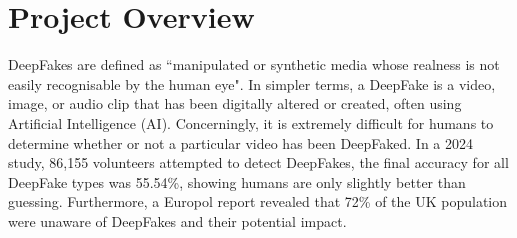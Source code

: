 
\section{Project Overview}
\label{sec:project-review}

DeepFakes are defined as ``manipulated or synthetic media whose realness is not easily recognisable by the human eye"\cite{altuncu2024deepfake}. In simpler terms, a DeepFake is a video, image, or audio clip that has been digitally altered or created, often using Artificial Intelligence (AI). Concerningly, it is extremely difficult for humans to determine whether or not a particular video has been DeepFaked. In a 2024 study, 86,155 volunteers attempted to detect DeepFakes, the final accuracy for all DeepFake types was 55.54\%\cite{diel2024human}, showing humans are only slightly better than guessing. Furthermore, a Europol report revealed that 72\% of the UK population were unaware of DeepFakes and their potential impact\cite{europol2022facing}.

